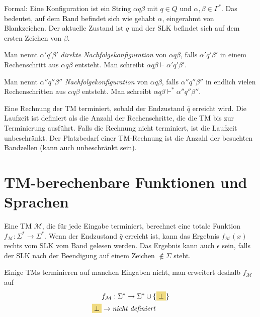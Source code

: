 \documentclass{scrartcl}%
\begin{document}
    \vspace*{0.3cm}
    Formal: Eine Konfiguration ist ein String $\alpha q\beta$ mit $q \in Q$ und $\alpha, \beta \in \Gamma^*$.
    Das bedeutet, auf dem Band befindet sich wie gehabt $\alpha$, eingerahmt von Blankzeichen.
    Der aktuelle Zustand ist $q$ und der SLK befindet sich auf dem ersten Zeichen von $\beta$.

    \vspace*{0.3cm}
    Man nennt $\alpha'q'\beta'$ \textit{direkte Nachfolgekonfiguration} von $\alpha q\beta$,
    falls $\alpha'q'\beta'$ in einem Rechenschritt aus $\alpha q\beta$ entsteht.
    Man schreibt
    $\alpha q\beta \vdash \alpha'q'\beta'$.

    Man nennt $\alpha''q''\beta''$ \textit{Nachfolgekonfiguration} von $\alpha q\beta$,
    falls $\alpha''q''\beta''$ in endlich vielen Rechenschritten aus $\alpha q\beta$ entsteht.
    Man schreibt
    $\alpha q\beta \vdash^* \alpha''q''\beta''$.

    \vspace*{0.3cm}
    Eine Rechnung der TM terminiert, sobald der Endzustand $\bar{q}$ erreicht wird.
    Die Laufzeit ist definiert als die Anzahl der Rechenschritte, die die TM bis zur Terminierung ausführt.
    Falls die Rechnung nicht terminiert, ist die Laufzeit unbeschränkt.
    Der Platzbedarf einer TM-Rechnung ist die Anzahl der besuchten Bandzellen (kann auch unbeschränkt sein).

    \section*{TM-berechenbare Funktionen und Sprachen}
    Eine TM $\mathcal{M}$, die für jede Eingabe terminiert, berechnet eine totale Funktion $f_\mathcal{M} : \Sigma^* \rightarrow \Sigma^*$.
    Wenn der Endzustand $\bar{q}$ erreicht ist, kann das Ergebnis $f_\mathcal{M}(x)$ rechts vom SLK vom Band gelesen werden.
    Das Ergebnis kann auch $\epsilon$ sein, falls der SLK nach der Beendigung auf einem Zeichen $\notin \Sigma$ steht.

    \vspace*{0.3cm}
    Einige TMs terminieren auf manchen Eingaben nicht, man erweitert deshalb $f_\mathcal{M}$ auf
    \begin{equation*}
        \begin{align}
            & f_\mathcal{M} : \Sigma^* \rightarrow \Sigma^* \cup \{  \colorbox{buff}{$\bot$} \} \\
            \colorbox{buff}{$\bot$} & \rightarrow \textit{nicht definiert}
        \end{align}
    \end{equation*}
\end{document}

